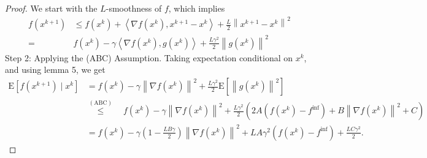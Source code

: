 \documentclass[8pt,a4paper]{article}
\begin{document}
\begin{proof}
	We start with the $L$-smoothness of $f$, which implies
	$$
	\begin{aligned}
		f\left(x^{k+1}\right) & \leq f\left(x^{k}\right)+\left\langle\nabla f\left(x^{k}\right), x^{k+1}-x^{k}\right\rangle+\frac{L}{2}\left\|x^{k+1}-x^{k}\right\|^{2} \\
	{=} & f\left(x^{k}\right)-\gamma\left\langle\nabla f\left(x^{k}\right), g\left(x^{k}\right)\right\rangle+\frac{L \gamma^{2}}{2}\left\|g\left(x^{k}\right)\right\|^{2}
	\end{aligned}
	$$
	Step 2: Applying the (ABC) Assumption.
	Taking expectation conditional on $x^{k}$, and using lemma 5, we get
	$$
	\begin{aligned}
		\mathrm{E}\left[f\left(x^{k+1}\right) \mid x^{k}\right] &=f\left(x^{k}\right)-\gamma\left\|\nabla f\left(x^{k}\right)\right\|^{2}+\frac{L \gamma^{2}}{2} \mathrm{E}\left[\left\|g\left(x^{k}\right)\right\|^{2}\right] \\
		& \stackrel{(\mathrm{ABC})}{\leq} \quad f\left(x^{k}\right)-\gamma\left\|\nabla f\left(x^{k}\right)\right\|^{2}+\frac{L \gamma^{2}}{2}\left(2 A\left(f\left(x^{k}\right)-f^{\mathrm{inf}}\right)+B\left\|\nabla f\left(x^{k}\right)\right\|^{2}+C\right) \\
		&=f\left(x^{k}\right)-\gamma\left(1-\frac{L B \gamma}{2}\right)\left\|\nabla f\left(x^{k}\right)\right\|^{2}+L A \gamma^{2}\left(f\left(x^{k}\right)-f^{\mathrm{inf}}\right)+\frac{L C \gamma^{2}}{2} .
	\end{aligned}
	$$
	

\end{proof}
\end{document}
